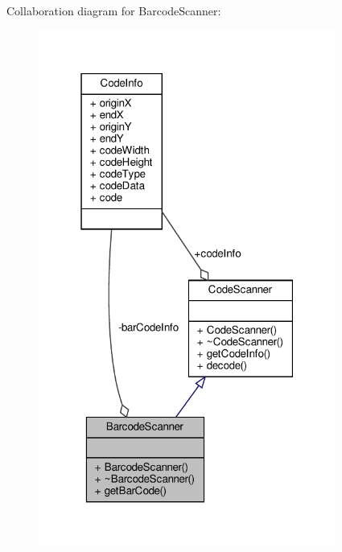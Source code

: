 Collaboration diagram for Barcode\+Scanner\+:
\nopagebreak
\begin{figure}[H]
\begin{center}
\leavevmode
\includegraphics[width=277pt]{class_barcode_scanner__coll__graph}
\end{center}
\end{figure}
